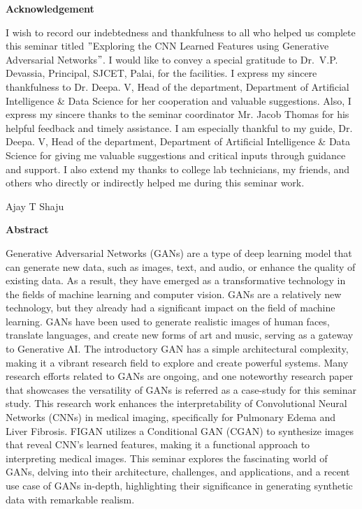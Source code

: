 \newpage
\thispagestyle{empty}
\begin{center}
  \vspace*{1cm}
  \textbf{\large Acknowledgement}
\end{center}
I wish to record our indebtedness and thankfulness to all who helped us complete this seminar titled $"$Exploring the CNN Learned Features using Generative Adversarial Networks$"$. I would like to convey a special gratitude to Dr.~V.P. Devassia, Principal, SJCET, Palai, for the facilities. I express my sincere thankfulness to Dr. Deepa. V, Head of the department, Department of Artificial Intelligence \& Data Science for her cooperation and valuable suggestions. Also, I express my sincere thanks to the seminar coordinator Mr. Jacob Thomas for his helpful feedback and timely assistance.
I am especially thankful to my guide, Dr. Deepa. V, Head of the department, Department of Artificial Intelligence \& Data Science for giving me valuable suggestions and critical inputs through guidance and support. I also extend my thanks to college lab technicians, my friends, and others who directly or indirectly helped me during this seminar work.
 \\
\begin{flushright}
Ajay T Shaju
\end{flushright}

\newpage
\thispagestyle{empty}
\begin{center}
  \textbf{\large Abstract}
\end{center}
Generative Adversarial Networks (GANs) are a type of deep learning model that can generate new data, such as images, text, and audio, or enhance the quality of existing data. As a result, they have emerged as a transformative technology in the fields of machine learning and computer vision. GANs are a relatively new technology, but they already had a significant impact on the field of machine learning. GANs have been used to generate realistic images of human faces, translate languages, and create new forms of art and music, serving as a gateway to Generative AI. The introductory GAN has a simple architectural complexity, making it a vibrant research field to explore and create powerful systems. Many research efforts related to GANs are ongoing, and one noteworthy research paper that showcases the versatility of GANs is referred as a case-study for this seminar study. This research work enhances the interpretability of Convolutional Neural Networks (CNNs) in medical imaging, specifically for Pulmonary Edema and Liver Fibrosis. FIGAN utilizes a Conditional GAN (CGAN) to synthesize images that reveal CNN's learned features, making it a functional approach to interpreting medical images. This seminar explores the fascinating world of GANs, delving into their architecture, challenges, and applications, and a recent use case of GANs in-depth, highlighting their significance in generating synthetic data with remarkable realism.

